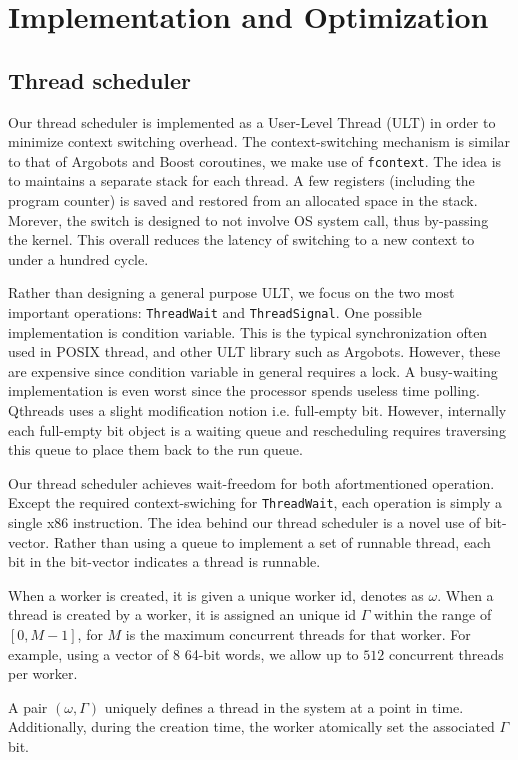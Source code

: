 \documentclass[11pt]{article}
\begin{document}
\section{Implementation and Optimization}
\subsection{Thread scheduler}
Our thread scheduler is implemented as a User-Level Thread (ULT) in order to
minimize context switching overhead. The context-switching mechanism is similar
to that of Argobots and Boost coroutines, we make use of \texttt{fcontext}. The
idea is to maintains a separate stack for each thread. A few registers
(including the program counter) is saved and restored from an allocated space
in the stack. Morever, the switch is designed to not involve OS system call,
thus by-passing the kernel. This overall reduces the latency of switching to a
new context to under a hundred cycle.

Rather than designing a general purpose ULT, we focus on the two most important
operations: \texttt{ThreadWait} and \texttt{ThreadSignal}. One possible
implementation is condition variable. This is the typical synchronization often
used in POSIX thread, and other ULT library such as Argobots.  However, these
are expensive since condition variable in general requires a lock. A
busy-waiting implementation is even worst since the processor spends useless
time polling. Qthreads uses a slight modification notion i.e.  full-empty bit.
However, internally each full-empty bit object is a waiting queue and
rescheduling requires traversing this queue to place them back to the run
queue.

Our thread scheduler achieves wait-freedom for both afortmentioned operation.
Except the required context-swiching for \texttt{ThreadWait}, each operation is
simply a single x86 instruction. The idea behind our thread scheduler is a novel
use of bit-vector. Rather than using a queue to implement a set of runnable thread,
each bit in the bit-vector indicates a thread is runnable.

When a worker is created, it is given a unique worker id, denotes as $\omega$.
When a thread is created by a worker, it is assigned an unique id $\Gamma$
within the range of $[0,M-1]$, for $M$ is the maximum concurrent threads for
that worker.  For example, using a vector of $8$ 64-bit words, we allow up to
$512$ concurrent threads per worker.

A pair $(\omega, \Gamma)$ uniquely defines a thread in the system at a point in
time. Additionally, during the creation time, the worker atomically set the
associated $\Gamma$ bit.
\end{document}
